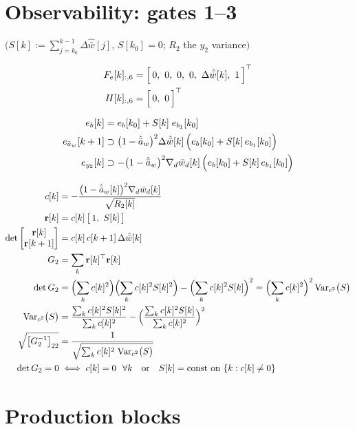 \documentclass[11pt,a4paper,fontset=none]{ctexart}
\newcommand{\ba}{\bar{a}}
\newcommand{\bw}{\bar{w}}
\newcommand{\dWh}{\Delta\hat{\bw}}
\newcommand{\ah}{\hat{\ba}_w}
\newcommand{\ea}{e_{\ba_w}}
\begin{document}
\section{Observability: gates 1--3}

$\bigl(S[k] := \sum_{j=k_0}^{k-1}\dWh[j]$, $S[k_0] = 0$; $R_2$ the $y_2$ variance$\bigr)$

\begin{align*}
F_e[k]_{:,6} &= \Bigl[\,0,\ 0,\ 0,\ 0,\ \dWh[k],\ 1\,\Bigr]^{\top} \\
H[k]_{:,6}   &= \Bigl[\,0,\ 0\,\Bigr]^{\top}
\end{align*}

\begin{align*}
e_b[k] &= e_b[k_0] + S[k]\;e_{b_1}[k_0] \\
\ea[k+1] &\supset \bigl(1-\ah\bigr)^{2}\dWh[k]\,\Bigl(e_b[k_0] + S[k]\,e_{b_1}[k_0]\Bigr) \\
e_{y_2}[k] &\supset -\bigl(1-\ah\bigr)^{2}\nabla_d\bw_d[k]\,\Bigl(e_b[k_0] + S[k]\,e_{b_1}[k_0]\Bigr)
\end{align*}

\begin{align*}
c[k] &= -\frac{\bigl(1-\ah[k]\bigr)^{2}\nabla_d\bw_d[k]}{\sqrt{R_2[k]}} \\
\mathbf{r}[k] &= c[k]\,\bigl[\,1,\ S[k]\,\bigr] \\
\det\begin{bmatrix} \mathbf{r}[k] \\ \mathbf{r}[k+1] \end{bmatrix} &= c[k]\,c[k+1]\,\dWh[k] \\
G_2 &= \sum_{k} \mathbf{r}[k]^{\top}\mathbf{r}[k] \\
\det G_2 &= \Bigl(\sum_k c[k]^{2}\Bigr)\Bigl(\sum_k c[k]^{2}S[k]^{2}\Bigr) - \Bigl(\sum_k c[k]^{2}S[k]\Bigr)^{2}
          = \Bigl(\sum_k c[k]^{2}\Bigr)^{2}\,\mathrm{Var}_{c^2}\bigl(S\bigr) \\
\mathrm{Var}_{c^2}\bigl(S\bigr) &= \frac{\sum_k c[k]^{2}S[k]^{2}}{\sum_k c[k]^{2}} - \Bigl(\frac{\sum_k c[k]^{2}S[k]}{\sum_k c[k]^{2}}\Bigr)^{2} \\
\sqrt{\bigl[G_2^{-1}\bigr]_{22}} &= \frac{1}{\sqrt{\sum_k c[k]^{2}\;\mathrm{Var}_{c^2}\bigl(S\bigr)}} \\
\det G_2 = 0 &\iff c[k] = 0\ \ \forall k \quad \text{or} \quad S[k] = \text{const on}\ \{k : c[k] \neq 0\}
\end{align*}

\clearpage
\section{Production blocks}
\end{document}
